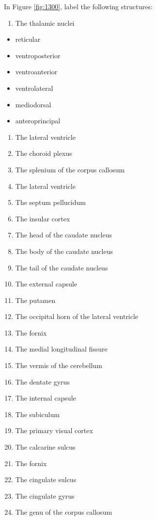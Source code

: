 \documentclass[]{book}
\providecommand{\tightlist}{%
  \setlength{\itemsep}{0pt}\setlength{\parskip}{0pt}}
\begin{document}
In Figure \ref{fig:1300}, label the following structures:

\begin{enumerate}
\def\labelenumi{\arabic{enumi}.}
\tightlist
\item
  The thalamic nuclei
\end{enumerate}

\begin{itemize}
\tightlist
\item
  reticular
\item
  ventroposterior
\item
  ventroanterior
\item
  ventrolateral
\item
  mediodorsal
\item
  anteroprincipal
\end{itemize}

\begin{enumerate}
\def\labelenumi{\arabic{enumi}.}
\tightlist
\item
  The lateral ventricle
\item
  The choroid plexus
\item
  The splenium of the corpus callosum
\item
  The lateral ventricle
\item
  The septum pellucidum
\item
  The insular cortex
\item
  The head of the caudate nucleus
\item
  The body of the caudate nucleus
\item
  The tail of the caudate nucleus
\item
  The external capsule
\item
  The putamen
\item
  The occipital horn of the lateral ventricle
\item
  The fornix
\item
  The medial longitudinal fissure
\item
  The vermis of the cerebellum
\item
  The dentate gyrus
\item
  The internal capsule
\item
  The subiculum
\item
  The primary visual cortex
\item
  The calcarine sulcus
\item
  The fornix
\item
  The cingulate sulcus
\item
  The cingulate gyrus
\item
  The genu of the corpus callosum
\end{enumerate}
\end{document}
